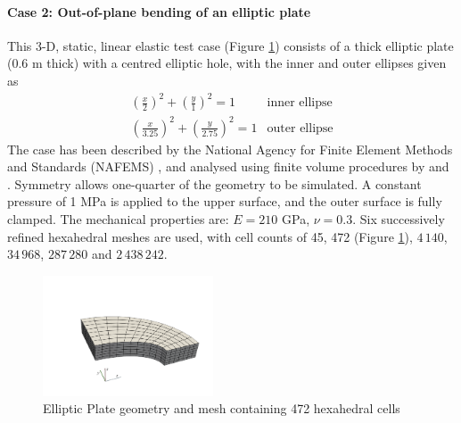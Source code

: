 \documentclass[sn-mathphys,Numbered]{sn-jnl}%
\begin{document}
\paragraph{Case 2: Out-of-plane bending of an elliptic plate}
This 3-D, static, linear elastic test case (Figure \ref{fig:elliptic_plate}) consists of a thick elliptic plate (0.6 m thick) with a centred elliptic hole, with the inner and outer ellipses given as
\begin{eqnarray}
	\left(\frac{x}{2}\right)^2 + \left(\frac{y}{1}\right)^2 = 1 & \text{inner ellipse} \\
	\left(\frac{x}{3.25}\right)^2 + \left(\frac{y}{2.75}\right)^2 = 1 & \text{outer ellipse}
\end{eqnarray}
The case has been described by the National Agency for Finite Element Methods and Standards (NAFEMS) \cite{Hitchings1987}, and analysed using finite volume procedures by \citet{Demirdzic1997a} and \citet{Cardiff2016a}.
Symmetry allows one-quarter of the geometry to be simulated.
A constant pressure of 1 MPa is applied to the upper surface, and the outer surface is fully clamped.
The mechanical properties are: $E = 210$ GPa, $\nu = 0.3$.
Six successively refined hexahedral meshes are used, with cell counts of 45, 472 (Figure \ref{fig:elliptic_plate}), $4\,140$, $34\,968$, $287\,280$ and $2\,438\,242$.
\begin{figure}[htbp]
   \centering
		\includegraphics[width=0.45\textwidth]{figures/elliptic_plate.pdf} 
   \caption{Elliptic Plate geometry and mesh containing 472 hexahedral cells}
   \label{fig:elliptic_plate}
\end{figure}
\end{document}
